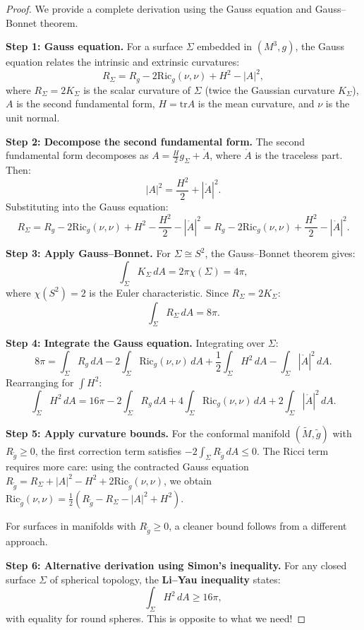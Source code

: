 \documentclass[12pt]{article}
\theoremstyle{plain}
\theoremstyle{definition}
\theoremstyle{remark}
\newcommand{\tr}{\mathrm{tr}}
\newcommand{\Ric}{\mathrm{Ric}}
\newcommand{\tM}{\tilde{M}}
\newcommand{\tg}{\tilde{g}}
\begin{document}
\begin{proof}
We provide a complete derivation using the Gauss equation and Gauss--Bonnet theorem.

\textbf{Step 1: Gauss equation.}
For a surface $\Sigma$ embedded in $(M^3, g)$, the Gauss equation relates the intrinsic and extrinsic curvatures:
\[
R_\Sigma = R_g - 2\Ric_g(\nu, \nu) + H^2 - |A|^2,
\]
where $R_\Sigma = 2K_\Sigma$ is the scalar curvature of $\Sigma$ (twice the Gaussian curvature $K_\Sigma$), $A$ is the second fundamental form, $H = \tr A$ is the mean curvature, and $\nu$ is the unit normal.

\textbf{Step 2: Decompose the second fundamental form.}
The second fundamental form decomposes as $A = \frac{H}{2}g_\Sigma + \mathring{A}$, where $\mathring{A}$ is the traceless part. Then:
\[
|A|^2 = \frac{H^2}{2} + |\mathring{A}|^2.
\]
Substituting into the Gauss equation:
\[
R_\Sigma = R_g - 2\Ric_g(\nu, \nu) + H^2 - \frac{H^2}{2} - |\mathring{A}|^2 = R_g - 2\Ric_g(\nu, \nu) + \frac{H^2}{2} - |\mathring{A}|^2.
\]

\textbf{Step 3: Apply Gauss--Bonnet.}
For $\Sigma \cong S^2$, the Gauss--Bonnet theorem gives:
\[
\int_\Sigma K_\Sigma \, dA = 2\pi \chi(\Sigma) = 4\pi,
\]
where $\chi(S^2) = 2$ is the Euler characteristic. Since $R_\Sigma = 2K_\Sigma$:
\[
\int_\Sigma R_\Sigma \, dA = 8\pi.
\]

\textbf{Step 4: Integrate the Gauss equation.}
Integrating over $\Sigma$:
\[
8\pi = \int_\Sigma R_g \, dA - 2\int_\Sigma \Ric_g(\nu, \nu) \, dA + \frac{1}{2}\int_\Sigma H^2 \, dA - \int_\Sigma |\mathring{A}|^2 \, dA.
\]
Rearranging for $\int H^2$:
\begin{equation}\label{eq:H2-formula}
\int_\Sigma H^2 \, dA = 16\pi - 2\int_\Sigma R_g \, dA + 4\int_\Sigma \Ric_g(\nu, \nu) \, dA + 2\int_\Sigma |\mathring{A}|^2 \, dA.
\end{equation}

\textbf{Step 5: Apply curvature bounds.}
For the conformal manifold $(\tM, \tg)$ with $R_{\tg} \geq 0$, the first correction term satisfies $-2\int_\Sigma R_{\tg} \, dA \leq 0$. The Ricci term requires more care: using the contracted Gauss equation $R_{\tg} = R_\Sigma + |A|^2 - H^2 + 2\Ric_{\tg}(\nu, \nu)$, we obtain $\Ric_{\tg}(\nu, \nu) = \frac{1}{2}(R_{\tg} - R_\Sigma - |A|^2 + H^2)$.

For surfaces in manifolds with $R_{\tg} \geq 0$, a cleaner bound follows from a different approach.

\textbf{Step 6: Alternative derivation using Simon's inequality.}
For any closed surface $\Sigma$ of spherical topology, the \textbf{Li--Yau inequality} \cite{LiYau1982} states:
\[
\int_\Sigma H^2 \, dA \geq 16\pi,
\]
with equality for round spheres. This is opposite to what we need!


\end{proof}
\end{document}
